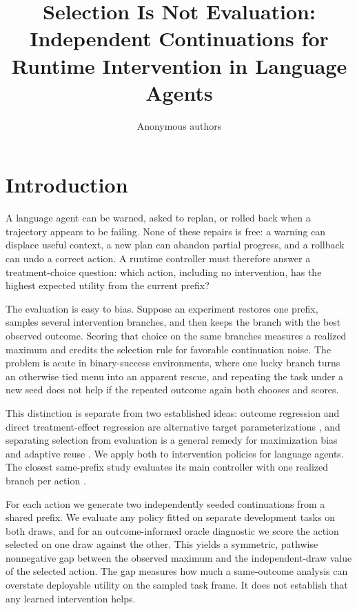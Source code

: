\documentclass{article}
\title{Selection Is Not Evaluation:\\Independent Continuations for Runtime Intervention in Language Agents}
\author{Anonymous authors}
\begin{document}
\maketitle

\begin{abstract}

\end{abstract}

\section{Introduction}

A language agent can be warned, asked to replan, or rolled back when a trajectory appears to be failing. None of these repairs is free: a warning can displace useful context, a new plan can abandon partial progress, and a rollback can undo a correct action. A runtime controller must therefore answer a treatment-choice question: which action, including no intervention, has the highest expected utility from the current prefix?

The evaluation is easy to bias. Suppose an experiment restores one prefix, samples several intervention branches, and then keeps the branch with the best observed outcome. Scoring that choice on the same branches measures a realized maximum and credits the selection rule for favorable continuation noise. The problem is acute in binary-success environments, where one lucky branch turns an otherwise tied menu into an apparent rescue, and repeating the task under a new seed does not help if the repeated outcome again both chooses and scores.

This distinction is separate from two established ideas: outcome regression and direct treatment-effect regression are alternative target parameterizations \citep{kunzel2019metalearners}, and separating selection from evaluation is a general remedy for maximization bias and adaptive reuse \citep{vanhasselt2010double,dwork2015generalization}. We apply both to intervention policies for language agents. The closest same-prefix study evaluates its main controller with one realized branch per action \citep{zhang2026calibration}.

For each action we generate two independently seeded continuations from a shared prefix. We evaluate any policy fitted on separate development tasks on both draws, and for an outcome-informed oracle diagnostic we score the action selected on one draw against the other. This yields a symmetric, pathwise nonnegative gap between the observed maximum and the independent-draw value of the selected action. The gap measures how much a same-outcome analysis can overstate deployable utility on the sampled task frame. It does not establish that any learned intervention helps.
\end{document}
